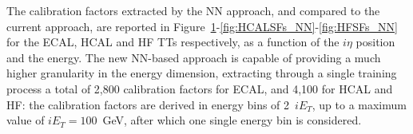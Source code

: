 The calibration factors extracted by the NN approach, and compared to the current approach, are reported in Figure~\ref{fig:ECALSFs_NN}-\ref{fig:HCALSFs_NN}-\ref{fig:HFSFs_NN} for the ECAL, HCAL and HF TTs respectively, as a function of the $i\eta$ position and the energy.
The new NN-based approach is capable of providing a much higher granularity in the energy dimension, extracting through a single training process a total of 2,800 calibration factors for ECAL, and 4,100 for HCAL and HF: the calibration factors are derived in energy bins of 2~$iE_T$, up to a maximum value of $iE_T=100$~GeV, after which one single energy bin is considered. 

\begin{figure}
    \centering
    \caption{}
    \label{fig:ECALSFs_NN}
\end{figure}

